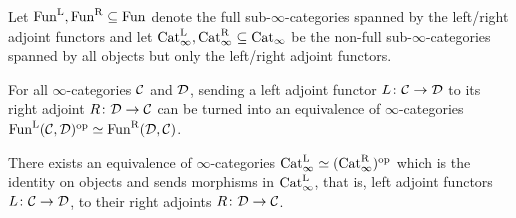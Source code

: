 \begin{cor}\label{cor:ExtractingAdjoints}
	Let $\operatorname{Fun}^{\mathrm{L}},\operatorname{Fun}^{\mathrm{R}}\subseteq \operatorname{Fun}$ denote the full sub-$\infty$-categories spanned by the left/right adjoint functors and let $\mathrm{Cat}_\infty^{\mathrm{L}},\mathrm{Cat}_\infty^{\mathrm{R}}\subseteq \mathrm{Cat}_\infty$ be the non-full sub-$\infty$-categories  spanned by all objects but only the left/right adjoint functors.
	\begin{alphanumerate}
		\item For all $\infty$-categories $\mathcal{C}$ and $\mathcal{D}$, sending a left adjoint functor $L\colon \mathcal{C}\rightarrow \mathcal{D}$ to its right adjoint $R\colon \mathcal{D}\rightarrow \mathcal{C}$ can be turned into an equivalence of $\infty$-categories $\operatorname{Fun}^{\mathrm{L}}(\mathcal{C},\mathcal{D})^{\mathrm{op}}\simeq \operatorname{Fun}^{\mathrm{R}}(\mathcal{D},\mathcal{C})$.\label{enum:FunLFunR}
		\item \!There exists an equivalence of $\infty$-categories $\mathrm{Cat}_\infty^{\mathrm{L}}\simeq (\mathrm{Cat}_\infty^{\mathrm{R}})^{\mathrm{op}}$ which is the identity on objects and sends morphisms in $\mathrm{Cat}_\infty^{\mathrm{L}}$, that is, left adjoint functors $L\colon \mathcal{C}\rightarrow \mathcal{D}$, to their right adjoints $R\colon \mathcal{D}\rightarrow \mathcal{C}$.\label{enum:CatLCatR}
	\end{alphanumerate}
\end{cor}
